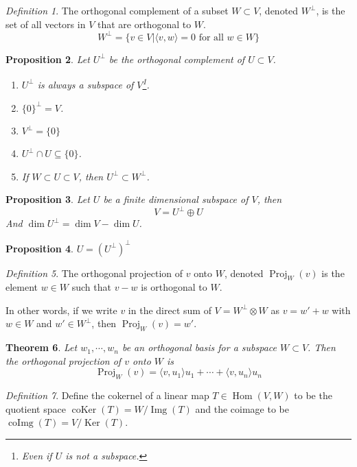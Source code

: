 \documentclass[12pt]{amsart}
\DeclareMathOperator{\coker}{coKer}
\DeclareMathOperator{\coimg}{coImg}
\renewcommand{\ker}{\Ker}
\DeclareMathOperator{\Ker}{Ker}
\DeclareMathOperator{\proj}{Proj}
\DeclareMathOperator{\Hom}{Hom}
\DeclareMathOperator{\img}{Img}
\newtheorem{theorem}{Theorem}[section]
\newtheorem{proposition}[theorem]{Proposition}
\theoremstyle{remark}
\newtheorem{definition}[theorem]{Definition}
\numberwithin{equation}{section}
\begin{document}
	\begin{definition}
		The orthogonal complement of a subset $W\subset V$, denoted $W^\perp$, is the set of all vectors in $V$ that are orthogonal to $W$.
		\[W^{\perp}=\{v\in V |\langle v,w\rangle =0 \text{ for all }w\in W\}\]
	\end{definition}
	
	\begin{proposition}Let $U^\perp$ be the orthogonal complement of $U\subset V$.
	\begin{enumerate}
		\item $U^\perp$ is always a subspace of $V$\footnote{Even if $U$ is not a subspace.}.
		\item $\{0\}^\perp=V$.
		\item $V^\perp=\{0\}$
		\item $U^\perp\cap U\subseteq \{0\}$.
		\item If $W\subset U\subset V$, then $U^\perp\subset W^\perp$.
	\end{enumerate} 
	\end{proposition}
	\begin{proposition}
		Let $U$ be a finite dimensional subspace of $V$, then
		\[V=U^\perp\oplus U\]
		And $\dim U^\perp=\dim V-\dim U$.
	\end{proposition}
	\begin{proposition}
		 $U=(U^\perp)^\perp$
	\end{proposition}
	
	\begin{definition}
			The orthogonal projection of $v$ onto $W$, denoted $\proj_W(v)$ is the element $w\in W$ such that $v-w$ is orthogonal to $W$.
			
			In other words, if we write $v$ in the direct sum of $V=W^\perp \otimes W$ as $v=w'+w$ with $w\in W$ and $w'\in W^\perp$, then $\proj_W(v)=w'$.

		\end{definition}

	\begin{theorem}
		Let $w_1,\cdots,w_n$ be an orthogonal basis for a subspace $W\subset V$. Then the orthogonal projection of $v$ onto $W$ is
		\[\proj_{W}(v)=\langle v,u_1\rangle u_1+\cdots+\langle v,u_n\rangle u_n\]
		
	\end{theorem}
	
	\begin{definition}
		Define the cokernel of a linear map $T\in\Hom(V,W)$ to be the quotient space $\coker(T)=W/\img(T)$ and the coimage to be $\coimg(T)=V/\ker(T)$.
	\end{definition}
	
\end{document}
